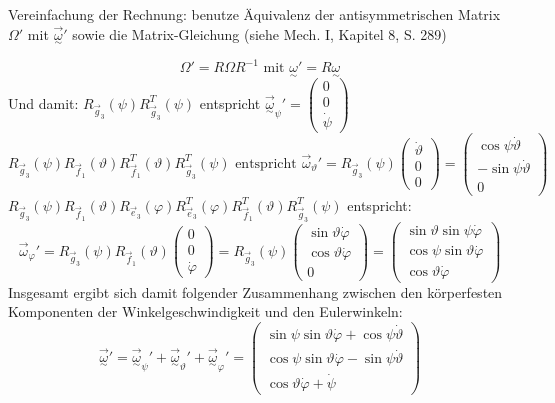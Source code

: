 \documentclass[10pt, letterpaper]{article}
\begin{document}
Vereinfachung der Rechnung: benutze Äquivalenz der antisymmetrischen Matrix $\Omega'$ mit $\vec{\underset{\sim}{\omega}}'$ sowie die Matrix-Gleichung (siehe Mech. I, Kapitel 8, S. 289)

\[\Omega' = R \Omega R^{-1} \text{ mit } \underset{\sim}{\omega}' = R \underset{\sim}{\omega}\]
Und damit: $R_{\vec{g}_3}(\psi) R_{\vec{g}_3}^T(\psi)$ entspricht $\vec{\underset{\sim}{\omega}}_{\psi}' = \begin{pmatrix} 0 \\ 0 \\ \dot{\psi} \end{pmatrix}$
$$R_{\vec{g}_3}(\psi) R_{\vec{f}_1}(\vartheta) R_{\vec{f}_1}^T(\vartheta) R_{\vec{g}_3}^T(\psi) \text{ entspricht }
\vec{\omega}_\vartheta' = R_{\vec{g}_3}(\psi) \begin{pmatrix} \dot{\vartheta} \\ 0 \\ 0 \end{pmatrix} = \begin{pmatrix} \cos\psi \dot{\vartheta} \\ -\sin\psi \dot{\vartheta} \\ 0 \end{pmatrix}$$
$R_{\vec{g}_3}(\psi) R_{\vec{f}_1}(\vartheta) R_{\vec{e}_3}(\varphi) R_{\vec{e}_3}^T(\varphi) R_{\vec{f}_1}^T(\vartheta) R_{\vec{g}_3}^T(\psi)$ entspricht:
$$\vec{\omega}_\varphi' = R_{\vec{g}_3}(\psi) R_{\vec{f}_1}(\vartheta) \begin{pmatrix} 0 \\ 0 \\ \dot{\varphi} \end{pmatrix} = R_{\vec{g}_3}(\psi) \begin{pmatrix} \sin\vartheta \dot{\varphi} \\ \cos\vartheta \dot{\varphi} \\ 0 \end{pmatrix} = \begin{pmatrix} \sin\vartheta \sin\psi \dot{\varphi} \\ \cos\psi \sin\vartheta \dot{\varphi} \\ \cos\vartheta \dot{\varphi} \end{pmatrix}$$
Insgesamt ergibt sich damit folgender Zusammenhang zwischen den körperfesten Komponenten der Winkelgeschwindigkeit und den Eulerwinkeln:
\[\vec{\underset{\sim}{\omega}}' = \vec{\underset{\sim}{\omega}}_\psi' + \vec{\underset{\sim}{\omega}}_\vartheta' + \vec{\underset{\sim}{\omega}}_\varphi' = \begin{pmatrix} \sin\psi \sin\vartheta \dot{\varphi} + \cos\psi \dot{\vartheta} \\ \cos\psi \sin\vartheta \dot{\varphi} - \sin\psi \dot{\vartheta} \\ \cos\vartheta \dot{\varphi} + \dot{\psi} \end{pmatrix}\]
\end{document}
